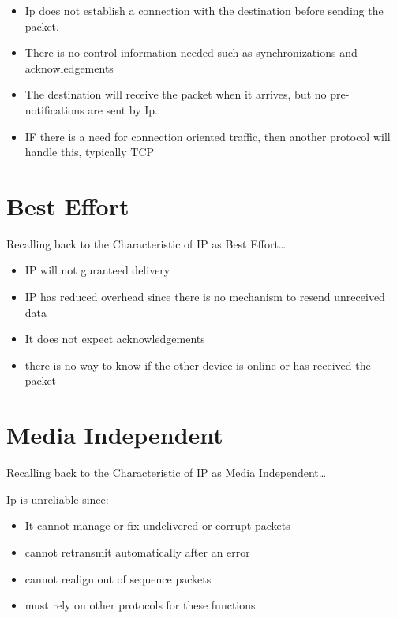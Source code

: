 \documentclass{article}
\begin{document}
\begin{itemize}
    \item Ip does not establish a connection with the destination before sending the packet.
    \item There is no control information needed such as synchronizations and acknowledgements
    \item The destination will receive the packet when it arrives, but no pre-notifications are sent by Ip.
    \item IF there is a need for connection oriented traffic, then another protocol will handle this, typically TCP 
    
\end{itemize}

\section{\textbf{Best Effort}}

Recalling back to the Characteristic of IP as Best Effort\dots

\begin{itemize}
    \item IP will not guranteed delivery
    \item IP has reduced overhead since there is no mechanism to resend unreceived data
    \item It does not expect acknowledgements
    \item there is no way to know if the other device is online or has received the packet
\end{itemize}

\section{\textbf{Media Independent}}

Recalling back to the Characteristic of IP as Media Independent\dots

\vspace{0.5cm}
Ip is unreliable since:

\begin{itemize}
    \item It cannot manage or fix undelivered or corrupt packets
    \item cannot retransmit automatically after an error
    \item cannot realign out of sequence packets
    \item must rely on other protocols for these functions
\end{itemize}
\end{document}
